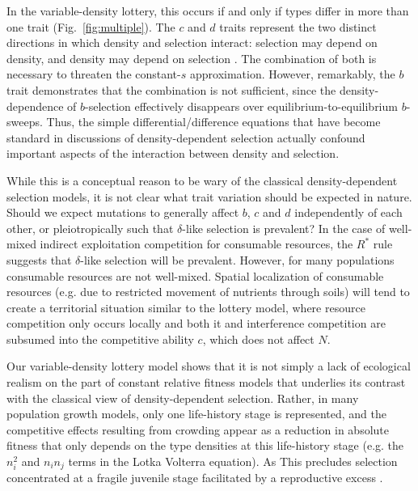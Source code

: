 \documentclass[12pt]{article}
\begin{document}
In the variable-density lottery, this occurs if and only if types differ in more than one trait (Fig.~\ref{fig:multiple}). The $c$ and $d$ traits represent the two distinct directions in which density and selection interact: selection may depend on density, and density may depend on selection \citep{prout_1980}. The combination of both is necessary to threaten the constant-$s$ approximation. However, remarkably, the $b$ trait demonstrates that the combination is not sufficient, since the density-dependence of $b$-selection effectively disappears over equilibrium-to-equilibrium $b$-sweeps. Thus, the simple differential/difference equations that have become standard in discussions of density-dependent selection \citep{roughgarden_1979,christiansen_2004,mallet_2012,travis_2013} actually confound important aspects of the interaction between density and selection. 

While this is a conceptual reason to be wary of the classical density-dependent selection models, it is not clear what trait variation should be expected in nature. Should we expect mutations to generally affect $b$, $c$ and $d$ independently of each other, or pleiotropically such that $\delta$-like selection is prevalent? In the case of well-mixed indirect exploitation competition for consumable resources, the $R^*$ rule  suggests that $\delta$-like selection will be prevalent. However, for many populations consumable resources are not well-mixed. Spatial localization of consumable resources (e.g. due to restricted movement of nutrients through soils) will tend to create a territorial situation similar to the lottery model, where resource competition only occurs locally and both it and interference competition are subsumed into the competitive ability $c$, which does not affect $N$. 

Our variable-density lottery model shows that it is not simply a lack of ecological realism on the part of constant relative fitness models that underlies its contrast with the classical view of density-dependent selection. Rather, in many population growth models, only one life-history stage is represented, and the competitive effects resulting from crowding appear as a reduction in absolute fitness that only depends on the type densities at this life-history stage (e.g. the $n_i^2$ and $n_in_j$ terms in the Lotka Volterra equation). As This precludes selection concentrated at a fragile juvenile stage facilitated by a reproductive excess \citep{chesson_1983,turner1968population,kimura1969natural,nei1971fertility}. 
\end{document}
